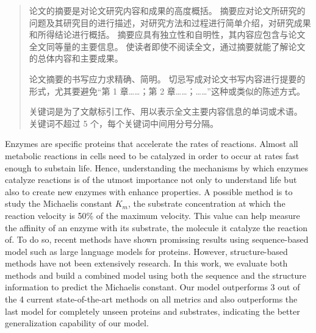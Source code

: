 

\begin{abstract}
  论文的摘要是对论文研究内容和成果的高度概括。
  摘要应对论文所研究的问题及其研究目的进行描述，对研究方法和过程进行简单介绍，对研究成果和所得结论进行概括。
  摘要应具有独立性和自明性，其内容应包含与论文全文同等量的主要信息。
  使读者即使不阅读全文，通过摘要就能了解论文的总体内容和主要成果。

  论文摘要的书写应力求精确、简明。
  切忌写成对论文书写内容进行提要的形式，尤其要避免“第 1 章……；第 2 章……；……”这种或类似的陈述方式。

  关键词是为了文献标引工作、用以表示全文主要内容信息的单词或术语。
  关键词不超过 5 个，每个关键词中间用分号分隔。

\end{abstract}

\begin{abstract*}
  Enzymes are specific proteins that accelerate the rates of reactions. 
  Almost all metabolic reactions in cells need to be catalyzed in order to occur at 
  rates fast enough to substain life. Hence, understanding the mechanisms by which enzymes
  catalyze reactions is of the utmost importance not only to understand life but also to
  create new enzymes with enhance properties. A possible method is to study the 
  Michaelis constant $K_m$, the substrate concentration at which the reaction velocity
  is 50\% of the maximum velocity. This value can help measure the affinity of an enzyme with
  its substrate, the molecule it catalyze the reaction of. To do so, recent methods have
  shown promissing results using sequence-based model such as large language models for
  proteins. However, structure-based methods have not been extensively research. In this
  work, we evaluate both methods and build a combined model using both the sequence and 
  the structure information to predict the Michaelis constant. Our model outperforms 3 out
  of the 4 current state-of-the-art methods on all metrics and also outperforms the last model 
  for completely unseen proteins and substrates, indicating the better generalization capability
  of our model. 

\end{abstract*}
